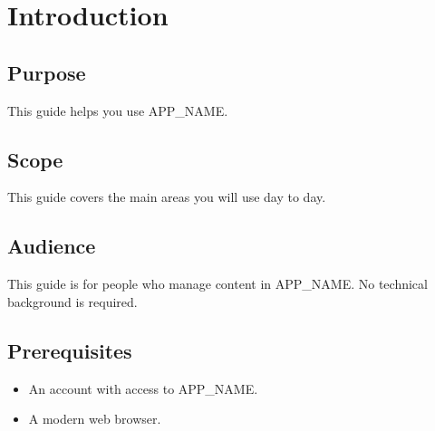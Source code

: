 \section{Introduction}


\subsection{Purpose}
This guide helps you use APP\_NAME.

\subsection{Scope}
This guide covers the main areas you will use day to day.

\subsection{Audience}
This guide is for people who manage content in APP\_NAME. No technical
background is required.

\subsection{Prerequisites}
\begin{itemize}
  \item An account with access to APP\_NAME.
  \item A modern web browser.
\end{itemize}
